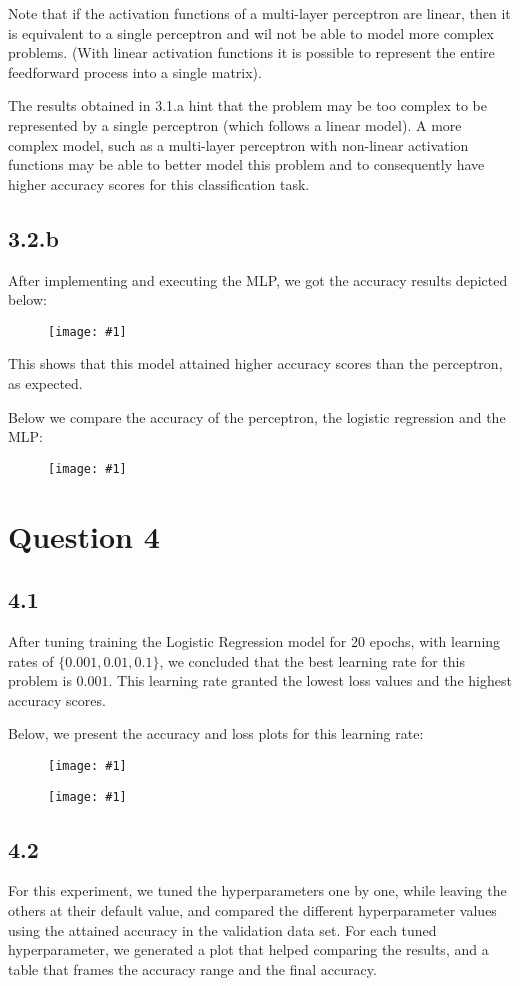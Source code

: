 \documentclass[10pt]{article}
\newcommand{\img}[1]{\begin{figure}[H]\centering\texttt{[image: \#1]}\end{figure}}
\begin{document}
Note that if the activation functions of a multi-layer perceptron are linear, then it is equivalent to a single perceptron and wil not be able to model more complex problems. (With linear activation functions it is possible to represent the entire feedforward process into a single matrix).

The results obtained in 3.1.a hint that the problem may be too complex to be represented by a single perceptron (which follows a linear model). A more complex model, such as a multi-layer perceptron with non-linear activation functions may be able to better model this problem and to consequently have higher accuracy scores for this classification task.

\newpage
\subsection{3.2.b}
After implementing and executing the MLP, we got the accuracy results depicted below:

\img{results/q3/2_b/acc_20-epochs.png}

This shows that this model attained higher accuracy scores than the perceptron, as expected.

Below we compare the accuracy of the perceptron, the logistic regression and the MLP:

\img{results/q3/2_b/q3_comparison.png}

\section{Question 4}
\subsection{4.1}
After tuning training the Logistic Regression model for 20 epochs, with learning rates of $\{0.001, 0.01, 0.1\}$, we concluded that the best learning rate for this problem is $0.001$.
This learning rate granted the lowest loss values and the highest accuracy scores.

Below, we present the accuracy and loss plots for this learning rate:
\img{results/q4/1/acc.png}

\img{results/q4/1/loss.png}


\subsection{4.2}
For this experiment, we tuned the hyperparameters one by one, while leaving the others at their default value, and compared the different hyperparameter values using the attained accuracy in the validation data set.
For each tuned hyperparameter, we generated a plot that helped comparing the results, and a table that frames the accuracy range and the final accuracy.
\end{document}
